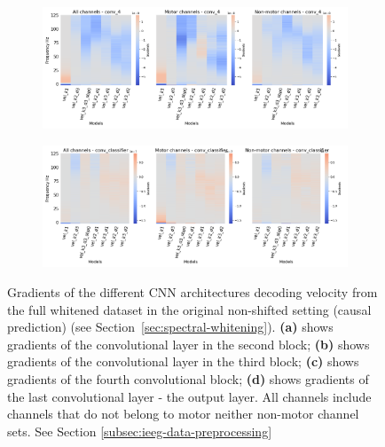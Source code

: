 \begin{figure}[!htbp]\ContinuedFloat

\begin{subfigure}[b]{\textwidth}
   \includegraphics[width=0.85\linewidth]{img/appendix/D/conv-4/m/vel_model_gradients_all_kinds}
   \caption{}
   \label{fig:vel-pw-full-grads-conv-4}
\end{subfigure}

\begin{subfigure}[b]{\textwidth}
   \includegraphics[width=0.85\linewidth]{img/appendix/D/conv-classifier/m/vel_model_gradients_all_kinds}
   \caption{}
   \label{fig:vel-pw-full-grads-conv-classifier}
\end{subfigure}

\caption[]{Gradients of the different CNN architectures decoding velocity from the full whitened dataset in the original non-shifted setting (causal prediction) (see Section~\ref{sec:spectral-whitening}). \textbf{(a)} shows gradients of the convolutional layer in the second block; \textbf{(b)} shows gradients of the convolutional layer in the third block; \textbf{(c)} shows gradients of the fourth convolutional block; \textbf{(d)} shows gradients of the last convolutional layer - the output layer. All channels include channels that do not belong to motor neither non-motor channel sets. See Section \ref{subsec:ieeg-data-preprocessing}}
\label{fig:vel-pw-full-grads}
\end{figure}

\clearpage
